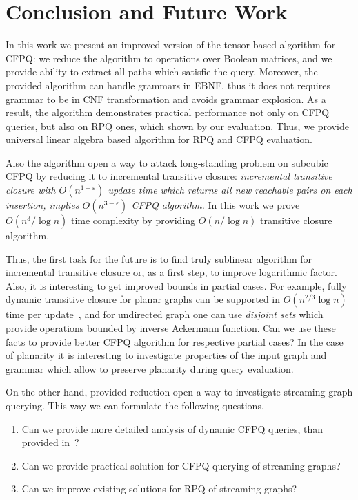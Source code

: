 \section{Conclusion and Future Work}

In this work we present an improved version of the tensor-based algorithm for CFPQ: we reduce the algorithm to operations over Boolean matrices, and we provide ability to extract all paths which satisfie the query.
Moreover, the provided algorithm can handle grammars in EBNF, thus it does not requires grammar to be in CNF transformation and avoids grammar explosion.
As a result, the algorithm demonstrates practical performance not only on CFPQ queries, but also on RPQ ones, which shown by our evaluation. 
Thus, we provide universal linear algebra based algorithm for RPQ and CFPQ evaluation.

Also the algorithm open a way to attack long-standing problem on subcubic CFPQ by reducing it to incremental transitive closure: \textit{incremental transitive closure with $O(n^{1-\varepsilon})$ update time which returns all new reachable pairs on each insertion, implies $O(n^{3-\varepsilon})$ CFPQ algorithm.}
In this work we prove $O(n^3/\log{n})$ time complexity by providing $O(n/\log{n})$ transitive closure algorithm.

Thus, the first task for the future is to find truly sublinear algorithm for incremental transitive closure or, as a first step, to improve logarithmic factor.
Also, it is interesting to get improved bounds in partial cases.
For example, fully dynamic transitive closure for planar graphs can be supported in $O(n^{2/3}\log{n})$ time per update~\cite{10.1007/3-540-57273-2_72}, and for undirected graph one can use \textit{disjoint sets} which provide operations bounded by inverse Ackermann function.
Can we use these facts to provide better CFPQ algorithm for respective partial cases? 
In the case of planarity it is interesting to investigate properties of the input graph and grammar which allow to preserve planarity during query evaluation.

On the other hand, provided reduction open a way to investigate streaming graph querying.
This way we can formulate the following questions.
\begin{enumerate}
\item Can we provide more detailed analysis of dynamic CFPQ queries, than provided in~\cite{10.1007/978-3-662-54458-7_16}?
\item Can we provide practical solution for CFPQ querying of streaming graphs?
\item Can we improve existing solutions for RPQ of streaming graphs?
\end{enumerate}


